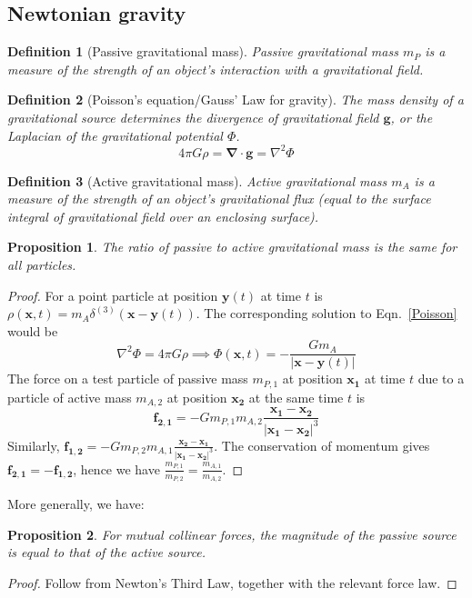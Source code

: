 \documentclass[a4paper]{article}
\theoremstyle{new}
\newtheorem{defi}{Definition}[section]
\newtheorem{prop}{Proposition}[section]
\begin{document}
\subsection{Newtonian gravity}
\begin{defi}[Passive gravitational mass]
Passive gravitational mass $m_P$ is a measure of the strength of an object's interaction with a gravitational field.
\end{defi}
\begin{defi}[Poisson's equation/Gauss' Law for gravity]
The mass density of a gravitational source determines the divergence of gravitational field $\mathbf{g}$, or the Laplacian of the gravitational potential $\Phi$.
\begin{equation}4\pi G\rho=\boldsymbol{\nabla}\cdot\mathbf{g}=\nabla^2\Phi\label{Poisson}
\end{equation}
\end{defi}
\begin{defi}[Active gravitational mass]
Active gravitational mass $m_A$ is a measure of the strength of an object's gravitational flux (equal to the surface integral of gravitational field over an enclosing surface).
\end{defi}
\begin{prop}
The ratio of passive to active gravitational mass is the same for all particles.
\end{prop}
\begin{proof}
For a point particle at position $\mathbf{y}(t)$ at time $t$ is $\rho(\mathbf{x},t)=m_A\delta^{(3)}(\mathbf{x}-\mathbf{y}(t))$. The corresponding solution to Eqn.~\ref{Poisson} would be
$$\nabla^2\Phi=4\pi G\rho\implies\Phi(\mathbf{x},t)=-\frac{Gm_A}{|\mathbf{x}-\mathbf{y}(t)|}$$
The force on a test particle of passive mass $m_{P,1}$ at position $\mathbf{x_1}$ at time $t$ due to a particle of active mass $m_{A,2}$ at position $\mathbf{x_2}$ at the same time $t$ is
$$\mathbf{f_{2,1}}=-Gm_{P,1}m_{A,2}\frac{\mathbf{x_1}-\mathbf{x_2}}{|\mathbf{x_1}-\mathbf{x_2}|^3}$$
Similarly, $\mathbf{f_{1,2}}=-Gm_{P,2}m_{A,1}\frac{\mathbf{x_2}-\mathbf{x_1}}{|\mathbf{x_1}-\mathbf{x_2}|^3}$. The conservation of momentum gives $\mathbf{f_{2,1}}=-\mathbf{f_{1,2}}$, hence we have $\frac{m_{P,1}}{m_{P,2}}=\frac{m_{A,1}}{m_{A,2}}$.
\end{proof}
More generally, we have:
\begin{prop}
For mutual collinear forces, the magnitude of the passive source is equal to that of the active source.
\end{prop}
\begin{proof}
Follow from Newton's Third Law, together with the relevant force law.
\end{proof}
\end{document}
